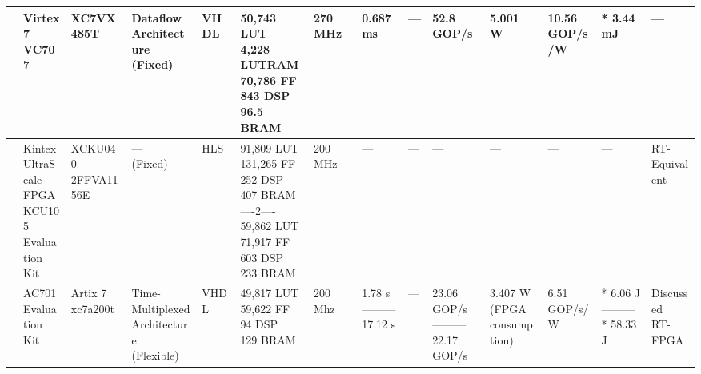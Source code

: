 \begin{center}
{\begin{tabular}{llllllllllllll}
\cite{kyriakosResourcesPowerEfficient2022} & \makecell[tl]{Virtex 7\\ VC707} & XC7VX485T & \makecell[tl]{Dataflow\\ Architecture\\ (Fixed)} & VHDL & \makecell[tl]{50,743 LUT\\ 4,228 LUTRAM\\ 70,786 FF\\ 843 DSP\\ 96.5 BRAM} & 270 MHz & 0.687 ms & --- & 52.8 GOP/s & 5.001 W & \makecell[tl]{10.56\\ GOP/s/W} & * 3.44 mJ & --- \\ \hline
\cite{nerisFPGABasedImplementationCNN2022} & \makecell[tl]{Kintex\\ UltraScale\\ FPGA\\ KCU105\\ Evaluation\\ Kit} & \makecell[tl]{XCKU040-\\2FFVA1156E} & \makecell[tl]{---\\ (Fixed)} & HLS & \makecell[tl]{91,809 LUT\\ 131,265 FF\\ 252 DSP\\ 407 BRAM\\ ----2----\\ 59,862 LUT\\ 71,917 FF\\ 603 DSP\\ 233 BRAM} & 200 MHz & --- & --- & --- & --- & --- & --- & \makecell[tl]{RT-\\Equivalent} \\ \hline
\cite{yanAutomaticDeploymentConvolutional2022} & \makecell[tl]{AC701\\ Evaluation\\ Kit} & \makecell[tl]{Artix 7\\ xc7a200t} & \makecell[tl]{Time-Multiplexed\\ Architecture\\ (Flexible)} & VHDL & \makecell[tl]{49,817 LUT\\ 59,622 FF\\ 94 DSP\\ 129 BRAM} & 200 Mhz & \makecell[tl]{1.78 s\\ ---------\\ 17.12 s} & --- & \makecell[tl]{23.06 GOP/s\\ ---------\\ 22.17 GOP/s} & \makecell[tl]{3.407 W \\ (FPGA\\ consumption)} & \makecell[tl]{6.51\\ GOP/s/W} & \makecell[tl]{* 6.06 J\\ ---------\\ * 58.33 J} & \makecell[tl]{Discussed\\ RT-FPGA} \\

\end{tabular}}
\end{center}
